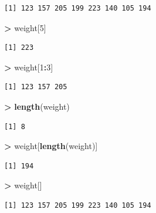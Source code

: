 \documentclass[]{krantz}
\makeatletter
\newenvironment{Shaded}{\begin{snugshade}}{\end{snugshade}}
\newcommand{\KeywordTok}[1]{\textcolor[rgb]{0.27,0.27,0.27}{\textbf{#1}}}
\newcommand{\DecValTok}[1]{\textcolor[rgb]{0.06,0.06,0.06}{#1}}
\newcommand{\StringTok}[1]{\textcolor[rgb]{0.5,0.5,0.5}{#1}}
\newcommand{\OperatorTok}[1]{\textcolor[rgb]{0.43,0.43,0.43}{\textbf{#1}}}
\newcommand{\NormalTok}[1]{#1}
\newenvironment{kframe}{%
\medskip{}
\setlength{\fboxsep}{.8em}
 \def\at@end@of@kframe{}%
 \ifinner\ifhmode%
  \def\at@end@of@kframe{\end{minipage}}%
  \begin{minipage}{\columnwidth}%
 \fi\fi%
 \def\FrameCommand##1{\hskip\@totalleftmargin \hskip-\fboxsep
 \colorbox{shadecolor}{##1}\hskip-\fboxsep
     \hskip-\linewidth \hskip-\@totalleftmargin \hskip\columnwidth}%
 \MakeFramed {\advance\hsize-\width
   \@totalleftmargin\z@ \linewidth\hsize
   \@setminipage}}%
 {\par\unskip\endMakeFramed%
 \at@end@of@kframe}
\renewenvironment{Shaded}{\begin{kframe}}{\end{kframe}}
\makeatother
\begin{document}
\begin{verbatim}
[1] 123 157 205 199 223 140 105 194
\end{verbatim}

\begin{Shaded}
\begin{Highlighting}[]
\OperatorTok{>}\StringTok{ }\NormalTok{weight[}\DecValTok{5}\NormalTok{]}
\end{Highlighting}
\end{Shaded}

\begin{verbatim}
[1] 223
\end{verbatim}

\begin{Shaded}
\begin{Highlighting}[]
\OperatorTok{>}\StringTok{ }\NormalTok{weight[}\DecValTok{1}\OperatorTok{:}\DecValTok{3}\NormalTok{]}
\end{Highlighting}
\end{Shaded}

\begin{verbatim}
[1] 123 157 205
\end{verbatim}

\begin{Shaded}
\begin{Highlighting}[]
\OperatorTok{>}\StringTok{ }\KeywordTok{length}\NormalTok{(weight)}
\end{Highlighting}
\end{Shaded}

\begin{verbatim}
[1] 8
\end{verbatim}

\begin{Shaded}
\begin{Highlighting}[]
\OperatorTok{>}\StringTok{ }\NormalTok{weight[}\KeywordTok{length}\NormalTok{(weight)]}
\end{Highlighting}
\end{Shaded}

\begin{verbatim}
[1] 194
\end{verbatim}

\begin{Shaded}
\begin{Highlighting}[]
\OperatorTok{>}\StringTok{ }\NormalTok{weight[]}
\end{Highlighting}
\end{Shaded}

\begin{verbatim}
[1] 123 157 205 199 223 140 105 194
\end{verbatim}
\end{document}

